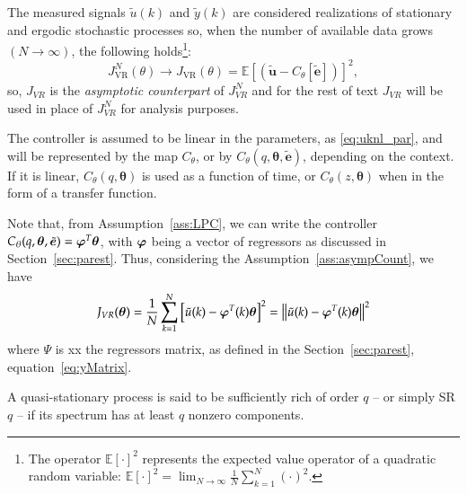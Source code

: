 \begin{assum} \label{ass:asympCount}
   The measured signals $\tilde{u}(k)$ and $\tilde{y}(k)$ are considered realizations of stationary and ergodic stochastic processes so, when the number of available data grows $(N \to \infty)$, the following holds\footnote{The operator $\mathbb{E}[\cdot]^{2}$ represents the expected value operator of a quadratic random variable: $\mathbb{E}[\cdot]^{2} = \lim_{N\to \infty} \frac{1}{N}\sum_{k=1}^{N} \left( \cdot \right)^{2}$.}:
   $$ J_{\mathrm{VR}}^{N}(\theta) \rightarrow J_{\mathrm{VR}}(\theta)=\mathbb{E}\left[ \left(\tilde{\bm{u}}-C_\theta[\tilde{\bm{e}} ]\right)\right]^{2}, $$
   so,  $J_{VR}$ is the \textit{asymptotic counterpart} of $J_{VR}^N$ and for the rest of text $J_{VR}$ will be used in place of $J_{VR}^N$ for analysis purposes.
\end{assum}

\begin{assum} \label{ass:LPC}
   The controller is assumed to be linear in the parameters, as \eqref{eq:uknl_par}, and will be represented by the map $C_{\theta}$, or by $C_\theta(q, \bm{\theta}, \tilde{\bm{e}} )$, depending on the context. If it is linear, $C_\theta(q,\bm{\theta})$ is used as a function of time, or $C_\theta(z,\bm{\theta})$ when in the form of a transfer function.
\end{assum}

Note that, from Assumption~\ref{ass:LPC}, we can write the controller $C_\theta(q,\bm{\theta},\tilde{\bm{e}}) = \bm{\bm{\varphi}}^{T}\bm{\theta}$, with $\bm{\bm{\varphi}}$ being a vector of regressors as discussed in Section~\ref{sec:parest}. Thus, considering the Assumption~\ref{ass:asympCount}, we have
\begin{equation}
   J_{VR}(\bm{\theta}) = \frac{1}{N}\sum_{k=1}^{N} \left[ \tilde{u}(k) - \bm{\varphi}^{T}(k)\bm{\theta} \right]^{2} = \left\lVert\tilde{u}(k)-\bm{\varphi}^T(k)\bm{\theta}\right\rVert^{2}
\label{eq:JVR_reg}
\end{equation}
where $\Psi$ is xx the regressors matrix, as defined in the Section~\ref{sec:parest}, equation~\ref{eq:yMatrix}.

\begin{defn} \label{def:SRq}
   A quasi-stationary process is said to be sufficiently rich of order $q$ -- or simply SR$q$ -- if its spectrum has at least $q$ nonzero components.
\end{defn}

